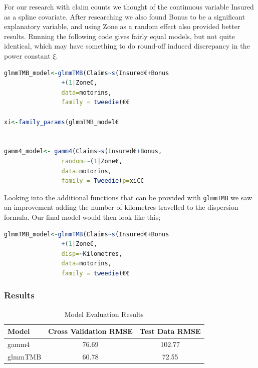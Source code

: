 \documentclass[12pt, twoside,hidelinks]{article}
\theoremstyle{definition}
\numberwithin{equation}{section}
\begin{document}
For our research with claim counts we thought of the continuous variable Insured as a spline covariate. After researching we also found Bonus to be a significant explanatory variable, and using Zone as a random effect also provided better results. Running the following code gives fairly equal models, but not quite identical, which may have something to do round-off induced discrepancy in the power constant $\xi$.

\begin{lstlisting}[language=R]
glmmTMB_model<-glmmTMB(Claims~s(Insured€+Bonus
                +(1|Zone€,
                data=motorins,
                family = tweedie(€€

xi<-family_params(glmmTMB_model€


gamm4_model<- gamm4(Claims~s(Insured€+Bonus,
                random=~(1|Zone€,
                data=motorins,
                family = Tweedie(p=xi€€
\end{lstlisting}

Looking into the additional functions that can be provided with \texttt{glmmTMB} we saw an improvement adding the number of kilometres travelled to the dispersion formula. Our final model would then look like this;

\begin{lstlisting}[language=R]
glmmTMB_model<-glmmTMB(Claims~s(Insured€+Bonus
                +(1|Zone€,
                disp=~Kilometres,
                data=motorins,
                family = tweedie(€€
\end{lstlisting}

\subsubsection{Results}


\begin{table}[H]
\centering
\caption{Model Evaluation Results}
\label{table:model_evaluationmort}
\begin{tabular}{lcc}
\hline
\textbf{Model} & \textbf{Cross Validation RMSE} & \textbf{Test Data RMSE} \\
\hline
gamm4 & 76.69  & 102.77 \\
glmmTMB & 60.78 &  72.55 \\
\hline
\end{tabular}
\end{table}
\end{document}

